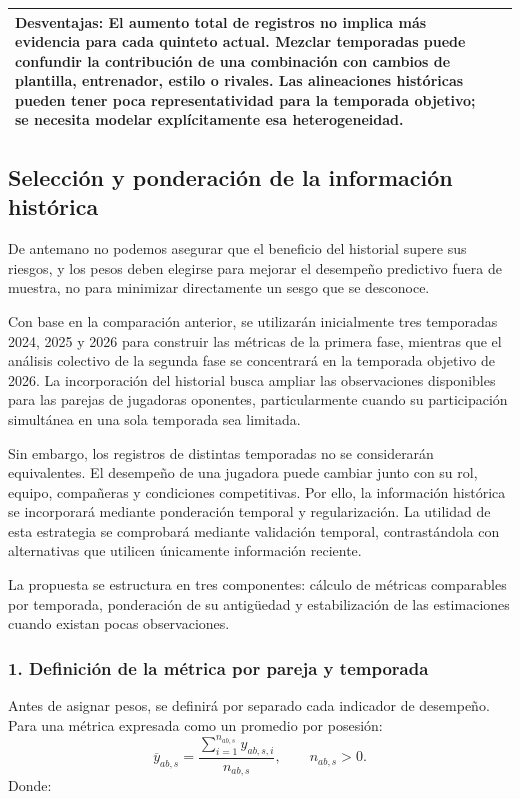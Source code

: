 \begin{longtable}{@{}p{2.15cm}p{5.35cm}p{5.35cm}@{}}
\textbf{Desventajas:} El aumento total de registros no implica más evidencia para cada quinteto actual. Mezclar temporadas puede confundir la contribución de una combinación con cambios de plantilla, entrenador, estilo o rivales. Las alineaciones históricas pueden tener poca representatividad para la temporada objetivo; se necesita modelar explícitamente esa heterogeneidad.\\
\bottomrule
\end{longtable}

\subsection{Selección y ponderación de la información histórica}
De antemano no podemos asegurar que el beneficio del historial supere sus riesgos, y los pesos deben elegirse para mejorar el desempeño predictivo fuera de muestra, no para minimizar directamente un sesgo que se desconoce.

Con base en la comparación anterior, se utilizarán inicialmente tres temporadas 2024, 2025 y 2026 para construir las métricas de la primera fase, mientras que el análisis colectivo de la segunda fase se concentrará en la temporada objetivo de 2026. La incorporación del historial busca ampliar las observaciones disponibles para las parejas de jugadoras oponentes, particularmente cuando su participación simultánea en una sola temporada sea limitada.

Sin embargo, los registros de distintas temporadas no se considerarán equivalentes. El desempeño de una jugadora puede cambiar junto con su rol, equipo, compañeras y condiciones competitivas. Por ello, la información histórica se incorporará mediante ponderación temporal y regularización. La utilidad de esta estrategia se comprobará mediante validación temporal, contrastándola con alternativas que utilicen únicamente información reciente.

La propuesta se estructura en tres componentes: cálculo de métricas comparables por temporada, ponderación de su antigüedad y estabilización de las estimaciones cuando existan pocas observaciones.

\subsubsection*{1. Definición de la métrica por pareja y temporada}
Antes de asignar pesos, se definirá por separado cada indicador de desempeño. Para una métrica expresada como un promedio por posesión:
\[
\overline y_{ab,s}=\frac{\sum_{i=1}^{n_{ab,s}}y_{ab,s,i}}{n_{ab,s}},\qquad n_{ab,s}>0.
\]
Donde:


